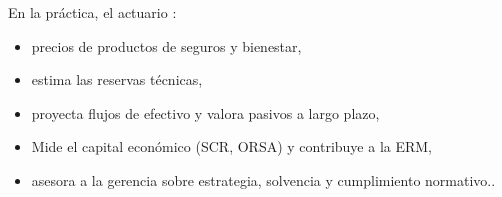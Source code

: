 \begin{f}[Actuario]
	
	En la práctica, el actuario :
	\begin{itemize}[nosep]
		\item precios de productos de seguros y bienestar, 
		\item estima las reservas técnicas,
		\item proyecta flujos de efectivo y valora pasivos a largo plazo,
		\item Mide el capital económico (SCR, ORSA) y contribuye a la ERM,
		\item asesora a la gerencia sobre estrategia, solvencia y cumplimiento normativo..
	\end{itemize}
	
\end{f}